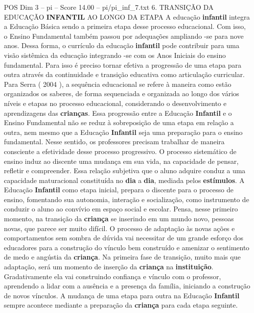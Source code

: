 \begin{textsample}{POS Dim 3 – pi – Score 14.00 – pi/pi\_inf\_7.txt}  \label{ex:f3_pos_257}
6.
TRANSIÇÃO DA EDUCAÇÃO \textbf{INFANTIL} AO LONGO DA ETAPA A educação \textbf{infantil} integra a Educação Básica sendo a primeira etapa desse processo educacional.
Com isso, o Ensino Fundamental também passou por adequações ampliando -se para nove anos.
Dessa forma, o currículo da educação \textbf{infantil} pode contribuir para uma visão sistêmica da educação integrando -se com os Anos Iniciais do ensino fundamental.
Para isso é preciso tornar efetiva a progressão de uma etapa para outra através da continuidade e transição educativa como articulação curricular.
Para Serra ( 2004 ), a sequência educacional se refere à maneira como estão organizados os saberes, de forma sequenciada e organizada ao longo dos vários níveis e etapas no processo educacional, considerando o desenvolvimento e aprendizagens das \textbf{crianças}.
Essa progressão entre a Educação \textbf{Infantil} e o Ensino Fundamental não se reduz à sobreposição de uma etapa em relação a outra, nem mesmo que a Educação \textbf{Infantil} seja uma preparação para o ensino fundamental.
Nesse sentido, os professores precisam trabalhar de maneira consciente a efetividade desse processo progressivo.
O processo sistemático de ensino induz ao discente uma mudança em sua vida, na capacidade de pensar, refletir e compreender.
Essa relação subjetiva que o aluno adquire conduz a uma capacidade maturacional constituída no \textbf{dia} a \textbf{dia}, mediada pelos \textbf{estímulos}.
A Educação \textbf{Infantil} como etapa inicial, prepara o discente para o processo de ensino, fomentando sua autonomia, interação e socialização, como instrumento de conduzir o aluno ao convívio em espaço social e escolar.
Pensa, nesse primeiro momento, na transição da \textbf{criança} se inserindo em um mundo novo, pessoas novas, que parece ser muito difícil.
O processo de adaptação às novas ações e comportamentos sem sombra de dúvida vai necessitar de um grande esforço dos educadores para a construção do vínculo bem construído e amenizar o sentimento de medo e angústia da \textbf{criança}.
Na primeira fase de transição, muito mais que adaptação, será um momento de inserção da \textbf{criança} na \textbf{instituição}.
Gradativamente ela vai construindo confiança e vínculo com o professor, aprendendo a lidar com a ausência e a presença da família, iniciando a construção de novos vínculos.
A mudança de uma etapa para outra na Educação \textbf{Infantil} sempre acontece mediante a preparação da \textbf{criança} para cada etapa seguinte.

\end{textsample}
